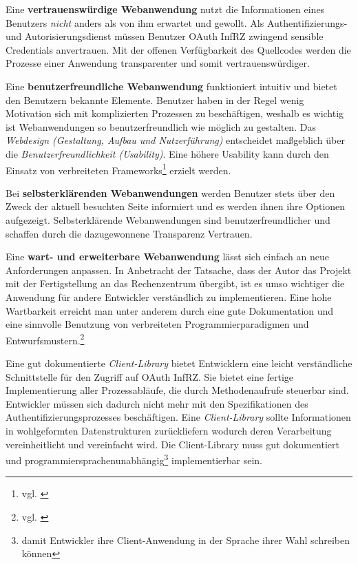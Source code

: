 \documentclass[12pt,a4paper,pointednumbers,abstracton]{scrartcl}
\begin{document}
Eine \textbf{vertrauenswürdige Webanwendung} nutzt die Informationen eines Benutzers \emph{nicht} anders als von ihm erwartet und gewollt.
Als Authentifizierungs- und Autorisierungsdienst müssen Benutzer OAuth InfRZ zwingend sensible Credentials anvertrauen.
Mit der offenen Verfügbarkeit des Quellcodes werden die Prozesse einer Anwendung transparenter und somit vertrauenswürdiger.

Eine \textbf{benutzerfreundliche Webanwendung} funktioniert intuitiv und bietet den Benutzern bekannte Elemente.
Benutzer haben in der Regel wenig Motivation sich mit komplizierten Prozessen zu beschäftigen, weshalb es wichtig ist Webanwendungen so benutzerfreundlich wie möglich zu gestalten.
Das \emph{Webdesign (Gestaltung, Aufbau und Nutzerführung)} entscheidet maßgeblich über die \emph{Benutzerfreundlichkeit (Usability)}.
Eine höhere Usability kann durch den Einsatz von verbreiteten Frameworks\footnote{vgl. \cite[Chapter 16]{Som10}} erzielt werden.

Bei \textbf{selbsterklärenden Webanwendungen} werden Benutzer stets über den Zweck der aktuell besuchten Seite informiert und es werden ihnen ihre Optionen aufgezeigt.
Selbsterklärende Webanwendungen sind benutzerfreundlicher und schaffen durch die dazugewonnene Transparenz Vertrauen.

Eine \textbf{wart- und erweiterbare  Webanwendung} lässt sich einfach an neue Anforderungen anpassen.
In Anbetracht der Tatsache, dass der Autor das Projekt mit der Fertigstellung an das Rechenzentrum übergibt, ist es umso wichtiger die Anwendung für andere Entwickler verständlich zu implementieren.
Eine hohe Wartbarkeit erreicht man unter anderem durch eine gute Dokumentation und eine sinnvolle Benutzung von verbreiteten Programmierparadigmen und Entwurfsmustern.\footnote{vgl. \cite[Section 6.3 \& Section 7.2]{Som10}}

Eine gut dokumentierte \emph{Client-Library} bietet Entwicklern eine leicht verständliche Schnittstelle für den Zugriff auf OAuth InfRZ.
Sie bietet eine fertige Implementierung aller Prozessabläufe, die durch Methodenaufrufe steuerbar sind.
Entwickler müssen sich dadurch nicht mehr mit den Spezifikationen des Authentifizierungsprozesses beschäftigen.
Eine \emph{Client-Library} sollte Informationen in wohlgeformten Datenstrukturen zurückliefern wodurch deren Verarbeitung vereinheitlicht und vereinfacht wird.
Die Client-Library muss gut dokumentiert und programmiersprachenunabhängig\footnote{damit Entwickler ihre Client-Anwendung in der Sprache ihrer Wahl schreiben können} implementierbar sein.
\end{document}
